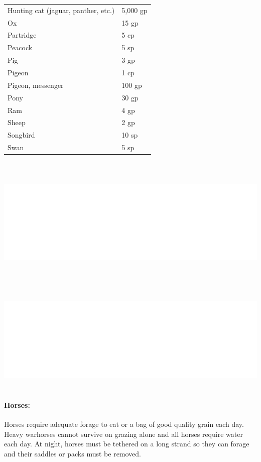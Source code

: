 \begin{multicols}{2}
\begin{minipage}{\columnwidth}
\begin{tabular}{|p{}|p{}|}
Hunting cat (jaguar, panther, etc.)	& 5,000 gp \\
\rowcolor[gray]{.9}Ox					& 15 gp \\
Partridge			& 5 cp \\
\rowcolor[gray]{.9}Peacock				& 5 sp \\
Pig					& 3 gp \\
\rowcolor[gray]{.9}Pigeon				& 1 cp \\
Pigeon, messenger	& 100 gp \\
\rowcolor[gray]{.9}Pony				& 30 gp \\
Ram					& 4 gp \\
\rowcolor[gray]{.9}Sheep				& 2 gp \\
Songbird			& 10 sp \\
\rowcolor[gray]{.9}Swan				& 5 sp \\
\hline
\end{tabular}

\end{minipage}

\noindent\includegraphics[width=\columnwidth, height=2.5in]{testblock.pdf} 

\noindent\includegraphics[width=\columnwidth, height=2in]{testblock.pdf} 

\paragraph{Horses:} Horses require adequate forage to eat or a bag of good quality grain each day.  Heavy warhorses cannot survive on grazing alone and all horses require water each day.  At night, horses must be tethered on a long strand so they can forage and their saddles or packs must be removed.


\end{multicols}
